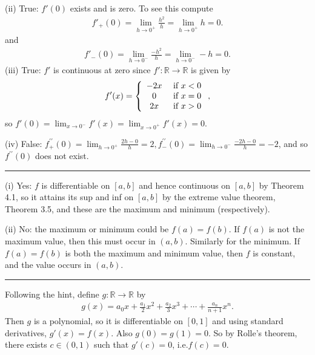 \documentclass[letterpaper,10pt,english]{jupyterBook}
\begin{document}
\sphinxAtStartPar
(ii) True: \(f'(0)\) exists and is zero. To see this compute
\begin{equation*}
\begin{split}
f'_{+}(0) = \lim_{h \rightarrow 0^+}\frac{h^{2}}{h} = \lim_{h \rightarrow 0^+} h= 0.
\end{split}
\end{equation*}
\sphinxAtStartPar
and
\begin{equation*}
\begin{split}
f'_{-}(0)= \lim_{h \rightarrow 0^-}\frac{-h^{2}}{h} = \lim_{h \rightarrow 0^-} -h =0.
\end{split}
\end{equation*}
\sphinxAtStartPar
(iii) True: \(f'\) is continuous at zero since \(f':\mathbb{R}\to\mathbb{R}\) is given by
\begin{equation*}
\begin{split}
f'(x) = \left\{\begin{array}{c c} -2x & ~\mbox{if}~x < 0\\ 0& ~\mbox{if}~x =0 \\ 2x & ~\mbox{if}~x > 0 \end{array} \right.,
\end{split}
\end{equation*}
\sphinxAtStartPar
so \(f'(0) = \lim_{x \rightarrow 0^-} f'(x) = \lim_{x \rightarrow 0^+}f'(x) = 0\).

\sphinxAtStartPar
(iv) False:  \(f^{\prime \prime}_{+}(0) = \lim_{h \rightarrow 0^+}\frac{2h - 0}{h} = 2, f^{\prime \prime}_{-}(0) = \lim_{h \rightarrow 0^-}\frac{-2h - 0}{h} = -2\), and so \(f^{\prime \prime}(0)\) does not exist.


\bigskip\hrule\bigskip


\sphinxAtStartPar
{\hyperref[\detokenize{Problems:id47}]{}}
(i) Yes: \(f\) is differentiable on \([a, b]\) and hence continuous on \([a, b]\) by Theorem  4.1, so it attains its sup and inf on \([a, b]\) by the extreme value theorem, Theorem 3.5, and these are the maximum and minimum (respectively).

\sphinxAtStartPar
(ii) No: the maximum or minimum could be \(f(a)=f(b)\).
If \(f(a)\) is not the maximum value, then this must occur in \((a, b)\). Similarly for the minimum. If \(f(a) = f(b)\) is both the maximum and minimum value, then \(f\) is constant, and the value occurs in \((a, b)\).


\bigskip\hrule\bigskip


\sphinxAtStartPar
{\hyperref[\detokenize{Problems:id48}]{}} Following the hint, define \(g:\mathbb{R}\rightarrow \mathbb{R}\) by
\begin{equation*}
\begin{split}
g(x) = a_{0}x + \frac{a_{1}}{2}x^{2} + \frac{a_{2}}{3}x^{3}  + \cdots + \frac{a_{n}}{n+1}x^{n}.
\end{split}
\end{equation*}
\sphinxAtStartPar
Then \(g\) is a polynomial, so it is differentiable on \([0, 1]\) and using standard derivatives, \(g'(x)=f(x)\). Also \(g(0) = g(1) = 0\). So by Rolle’s theorem, there exists \(c \in (0, 1)\) such that \(g'(c) = 0\), i.e.\(f(c) = 0\).
\end{document}
